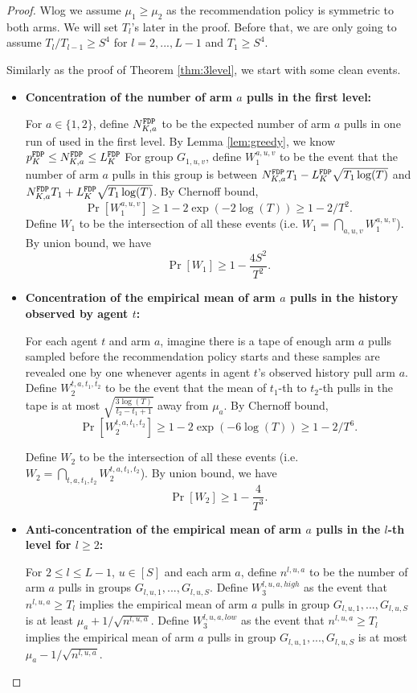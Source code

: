 \begin{proof}
Wlog we assume $\mu_1 \geq \mu_2$ as the recommendation policy is symmetric to both arms. We will set $T_l$'s later in the proof. Before that, we are only going to assume $T_l / T_{l-1} \geq S^4$ for $l=2,...,L-1$ and $T_1 \geq S^4$. 

Similarly as the proof of Theorem \ref{thm:3level}, we start with some clean events.

\begin{itemize}
\item  \textbf{Concentration of the number of arm $a$ pulls in the first level:} 

For $a \in \{1,2\}$, define $N^\mathtt{FDP}_{K,a}$ to be the expected number of arm $a$ pulls in one run of \ALGG used in the first level. By Lemma \ref{lem:greedy}, we know $p^\mathtt{FDP}_K \leq N^\mathtt{FDP}_{K,a} \leq L^\mathtt{FDP}_K$ For group $G_{1,u,v}$, define $W_1^{a,u,v}$ to be the event that the number of arm $a$ pulls in this group is between $N^\mathtt{FDP}_{K,a} T_1- L^\mathtt{FDP}_K \sqrt{T_1\log(T)}$ and $N^\mathtt{FDP}_{K,a} T_1 + L^\mathtt{FDP}_K \sqrt{T_1\log(T)}$. By Chernoff bound,
\[
\Pr[W_1^{a,u,v}] \geq 1-2\exp(-2\log(T)) \geq 1-2/T^2.
\]
Define $W_1$ to be the intersection of all these events (i.e. $W_1 = \bigcap_{a,u,v}W_1^{a,u,v}$). By union bound, we have
\[
\Pr[W_1] \geq 1- \frac{4S^2}{T^2}.
\]


\item \textbf{Concentration of the empirical mean of arm $a$ pulls in the history observed by agent $t$:}

 For each agent $t$ and arm $a$, imagine there is a tape of enough arm $a$ pulls sampled before the recommendation policy starts and these samples are revealed one by one whenever agents in agent $t$'s observed history pull arm $a$.  Define $W_2^{t,a,t_1,t_2}$ to be the event that the mean of $t_1$-th to $t_2$-th pulls in the tape is at most $\sqrt{\frac{3\log(T)}{t_2-t_1+1}}$ away from $\mu_a$. By Chernoff bound, 
\[
\Pr[W_2^{t,a,t_1,t_2}] \geq 1 - 2\exp(-6\log(T)) \geq 1- 2/T^6.
\]

Define $W_2$ to be the intersection of all these events (i.e. $W_2 = \bigcap_{t,a,t_1,t_2} W_2^{t,a,t_1,t_2}$). By union bound, we have
\[
\Pr[W_2] \geq 1- \frac{4}{T^3}.
\]


\item \textbf{Anti-concentration of the empirical mean of arm $a$ pulls in the $l$-th level  for $l \geq 2$:}

For $2\leq l \leq L-1$, $u\in [S]$ and each arm $a$, define $n^{l,u,a}$ to be the number of arm $a$ pulls in groups $G_{l,u,1},...,G_{l,u,S}$. Define $W_3^{l,u,a,high}$ as the event that $n^{l,u,a} \geq T_l$ implies the empirical mean of arm $a$ pulls in group $G_{l,u,1},...,G_{l,u,S}$ is at least $\mu_a + 1/\sqrt{n^{l,u,a}}$. Define $W_3^{l,u,a,low}$ as the event that $n^{l,u,a} \geq T_l$ implies the empirical mean of arm $a$ pulls in group $G_{l,u,1},...,G_{l,u,S}$ is at most $\mu_a - 1/\sqrt{n^{l,u,a}}$.


\end{itemize}
\end{proof}
